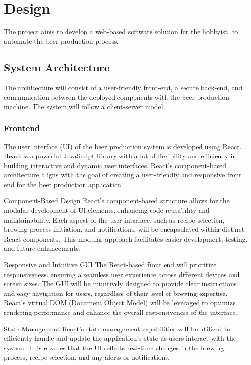 \section{Design}
The project aims to develop a web-based software solution for the hobbyist, to automate the beer production process. 

\subsection{System Architecture}
The architecture will consist of a user-friendly front-end, a secure back-end, and communication between the deployed components with the beer production machine. 
The system will follow a client-server model.

\subsubsection{Frontend}
The user interface (UI) of the beer production system is developed using React.
React is a powerful JavaScript library with a lot of flexibility and efficiency in building interactive and dynamic user interfaces. 
React's component-based architecture aligns with the goal of creating a user-friendly and responsive front end for the beer production application.

Component-Based Design
React's component-based structure allows for the modular development of UI elements, enhancing code reusability and maintainability. Each aspect of the user interface, such as recipe selection, brewing process initiation, and notifications, will be encapsulated within distinct React components. This modular approach facilitates easier development, testing, and future enhancements.

Responsive and Intuitive GUI
The React-based front end will prioritize responsiveness, ensuring a seamless user experience across different devices and screen sizes. The GUI will be intuitively designed to provide clear instructions and easy navigation for users, regardless of their level of brewing expertise. React's virtual DOM (Document Object Model) will be leveraged to optimize rendering performance and enhance the overall responsiveness of the interface.

State Management
React's state management capabilities will be utilized to efficiently handle and update the application's state as users interact with the system. This ensures that the UI reflects real-time changes in the brewing process, recipe selection, and any alerts or notifications.

